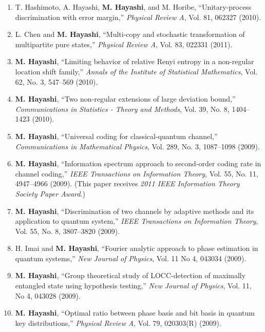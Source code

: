 \documentclass[a4paper,12pt,oneside]{article}
\begin{document}
\begin{enumerate}
\item   T. Hashimoto, A. Hayashi, \textbf{M. Hayashi}, and M. Horibe, 
``Unitary-process discrimination with error margin,'' 
{\em Physical Review A}, Vol. 81, 062327 (2010).

\item   L. Chen and \textbf{M. Hayashi}, 
``Multi-copy and stochastic transformation of multipartite pure states,'' 
{\em Physical Review A}, Vol. 83, 022331 (2011).

\item   \textbf{M. Hayashi}, 
``Limiting behavior of relative Renyi entropy in a non-regular location shift family,'' 
{\em Annals of the Institute of Statistical Mathematics}, Vol. 62, No. 3, 547--569 (2010).

\item   \textbf{M. Hayashi}, 
``Two non-regular extensions of large deviation bound,'' 
{\em Communications in Statistics - Theory and Methods}, 
Vol. 39, No. 8, 1404--1423 (2010). 

\item   \textbf{M. Hayashi}, 
``Universal coding for classical-quantum channel,'' 
{\em Communications in Mathematical Physics}, Vol. 289, No. 3, 1087--1098 (2009). 

\item   \textbf{M. Hayashi}, 
``Information spectrum approach to second-order coding rate in channel coding,'' 
{\em IEEE Transactions on Information Theory},
Vol. 55, No. 11, 4947--4966 (2009). 
(This paper receives {\em 2011 IEEE Information Theory Society Paper Award}.)

\item   \textbf{M. Hayashi}, 
``Discrimination of two channels by adaptive methods and its application to quantum system,'' 
{\em IEEE Transactions on Information Theory}, 
Vol. 55, No. 8, 3807--3820 (2009).

\item   H. Imai and \textbf{M. Hayashi}, 
``Fourier analytic approach to phase estimation in quantum systems,'' 
{\em New Journal of Physics}, Vol. 11 No 4, 043034 (2009). 

\item   \textbf{M. Hayashi}, 
``Group theoretical study of LOCC-detection of maximally entangled state using hypothesis testing,'' 
{\em New Journal of Physics}, Vol. 11, No 4, 043028 (2009).

\item   \textbf{M. Hayashi}, 
``Optimal ratio between phase basis and bit basis in quantum key distributions,'' 
{\em Physical Review A}, Vol. 79, 020303(R) (2009).


\end{enumerate}
\end{document}
